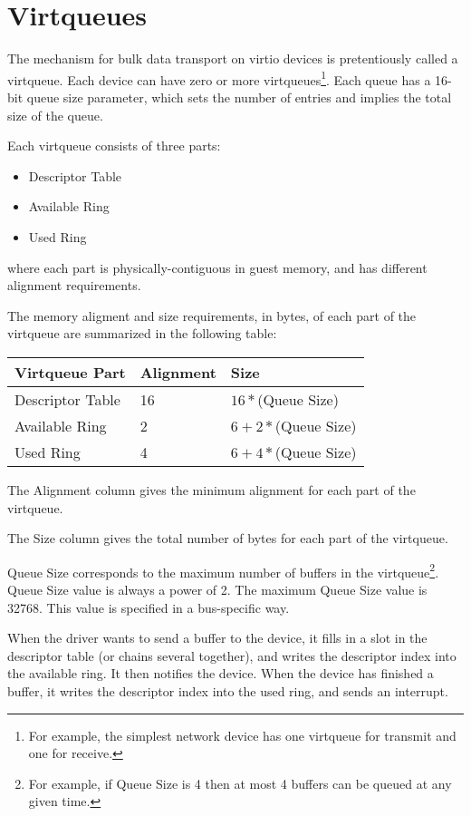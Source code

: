 \section{Virtqueues}\label{sec:Basic Facilities of a Virtio Device / Virtqueues}

The mechanism for bulk data transport on virtio devices is
pretentiously called a virtqueue. Each device can have zero or more
virtqueues\footnote{For example, the simplest network device has one virtqueue for
transmit and one for receive.}.  Each queue has a 16-bit queue size
parameter, which sets the number of entries and implies the total size
of the queue.

Each virtqueue consists of three parts:

\begin{itemize}
\item Descriptor Table
\item Available Ring
\item Used Ring
\end{itemize}

where each part is physically-contiguous in guest memory,
and has different alignment requirements.

The memory aligment and size requirements, in bytes, of each part of the
virtqueue are summarized in the following table:

\begin{tabular}{|l|l|l|}
\hline
Virtqueue Part    & Alignment & Size \\
\hline \hline
Descriptor Table  & 16        & $16 * $(Queue Size) \\
\hline
Available Ring    & 2         & $6 + 2 * $(Queue Size) \\
 \hline
Used Ring         & 4         & $6 + 4 * $(Queue Size) \\
 \hline
\end{tabular}

The Alignment column gives the minimum alignment for each part
of the virtqueue.

The Size column gives the total number of bytes for each
part of the virtqueue.

Queue Size corresponds to the maximum number of buffers in the
virtqueue\footnote{For example, if Queue Size is 4 then at most 4 buffers
can be queued at any given time.}.  Queue Size value is always a
power of 2.  The maximum Queue Size value is 32768.  This value
is specified in a bus-specific way.

When the driver wants to send a buffer to the device, it fills in
a slot in the descriptor table (or chains several together), and
writes the descriptor index into the available ring.  It then
notifies the device. When the device has finished a buffer, it
writes the descriptor index into the used ring, and sends an interrupt.


